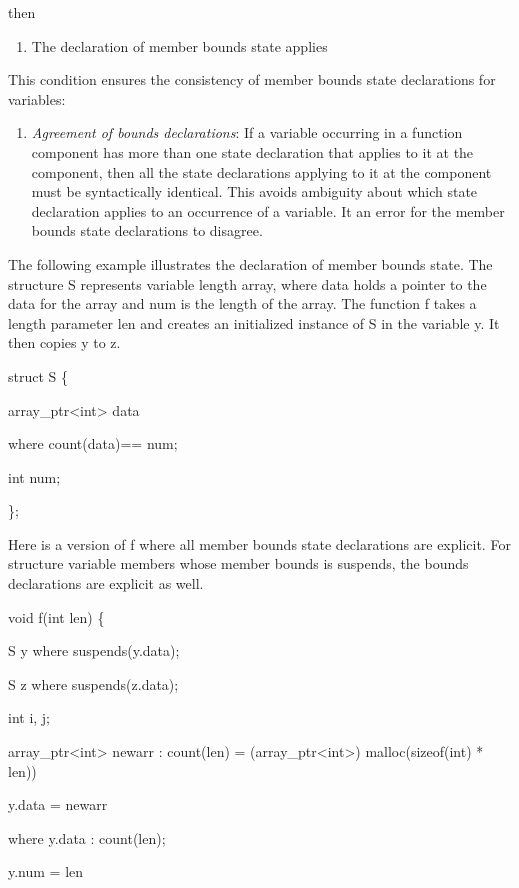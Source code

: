\documentclass[]{article}
\begin{document}
then

\begin{enumerate}
\def\labelenumi{\arabic{enumi}.}
\item
  The declaration of member bounds state applies
\end{enumerate}

This condition ensures the consistency of member bounds state
declarations for variables:

\begin{enumerate}
\def\labelenumi{\arabic{enumi}.}
\item
  \emph{Agreement of bounds declarations}: If a variable occurring in a
  function component has more than one state declaration that applies to
  it at the component, then all the state declarations applying to it at
  the component must be syntactically identical. This avoids ambiguity
  about which state declaration applies to an occurrence of a variable.
  It an error for the member bounds state declarations to disagree.
\end{enumerate}

The following example illustrates the declaration of member bounds
state. The structure S represents variable length array, where data
holds a pointer to the data for the array and num is the length of the
array. The function f takes a length parameter len and creates an
initialized instance of S in the variable y. It then copies y to z.

struct S \{

array\_ptr\textless{}int\textgreater{} data

where count(data)== num;

int num;

\};

Here is a version of f where all member bounds state declarations are
explicit. For structure variable members whose member bounds is
suspends, the bounds declarations are explicit as well.

void f(int len) \{

S y where suspends(y.data);

S z where suspends(z.data);

int i, j;

array\_ptr\textless{}int\textgreater{} newarr : count(len) =
(array\_ptr\textless{}int\textgreater{}) malloc(sizeof(int) * len))

y.data = newarr

where y.data : count(len);

y.num = len
\end{document}
